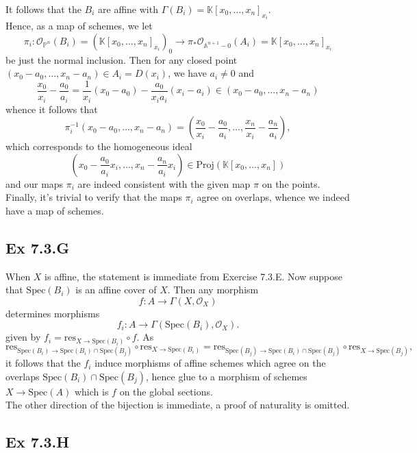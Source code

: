 \documentclass{article}
\theoremstyle{definition}
\newcommand{\K}{\mathbb{K}}
\renewcommand{\P}{\mathbb{P}}
\newcommand{\A}{\mathbb{A}}
\newcommand{\Pn}{\P^n}
\newcommand{\Spec}{\text{Spec}}
\begin{document}
It follows that the $B_i$ are affine with $\Gamma(B_i) = \K[x_{0}, \ldots,
		x_n]_{x_i}$. \\

Hence, as a map of schemes, we let
\[
	\pi_i
	:
	\mathcal{O}_{\Pn}(B_i)
	=
	(\K[x_{0}, \ldots, x_n]_{x_i})_0
	\to
	\pi_{*} \mathcal{O}_{\A^{n + 1} - 0}(A_i)
	=
	\K[x_{0}, \ldots, x_n]_{x_i}
\]
be just the normal inclusion. Then for any closed point $(x_{0} - a_0, \ldots,
	x_n - a_n) \in A_i = D(x_i)$, we have $a_i \not = 0$ and
\[
	\frac{x_{0}}{x_i} - \frac{a_{0}}{a_i}
	=
	\frac{1}{x_{i}}(x_{0} - a_{0})
	-
	\frac{a_{0}}{x_i a_i} (x_i - a_i)
	\in
	(x_{0} - a_0, \ldots, x_n - a_n)
\]
whence it follows that
\[
	\pi_i^{-1}(x_{0} - a_0, \ldots, x_n - a_n)
	=
	\left(\frac{x_{0}}{x_{i}} - \frac{a_{0}}{a_i}, \ldots, \frac{x_n}{x_i} - \frac{a_n}{a_i}\right),
\]
which corresponds to the homogeneous ideal
\[
	\left(x_{0} - \frac{a_{0}}{a_i} x_i, \ldots, x_n - \frac{a_n}{a_i}
	x_i\right) \in \text{Proj}(\K[x_{0}, \ldots, x_n])
\]
and our maps $\pi_i$ are indeed consistent with the given map $\pi$ on the points. \\

Finally, it's trivial to verify that the maps $\pi_i$ agree on overlaps, whence
we indeed have a map of schemes.

\subsection*{Ex 7.3.G}

When $X$ is affine, the statement is immediate from Exercise 7.3.E. Now suppose
that $\Spec(B_i)$ is an affine cover of $X$. Then any morphism
\[
	f : A \to \Gamma(X, \mathcal{O}_X)
\]
determines morphisms
\[
	f_i : A \to \Gamma(\Spec(B_i), \mathcal{O}_X).
\]
given by $f_i = \text{res}_{X \to \Spec(B_i)} \circ f$. As
\[
	\text{res}_{\Spec(B_i) \to \Spec(B_i) \cap \Spec(B_j)}
	\circ
	\text{res}_{X \to \Spec(B_i)}
	=
	\text{res}_{\Spec(B_j) \to \Spec(B_i) \cap \Spec(B_j)}
	\circ
	\text{res}_{X \to \Spec(B_j)},
\]
it follows that the $f_i$ induce morphisms of affine schemes which agree on the
overlaps $\Spec(B_i) \cap \Spec(B_j)$, hence glue to a morphism of schemes $X
	\to \Spec(A)$ which is $f$ on the global sections. \\

The other direction of the bijection is immediate, a proof of naturality is
omitted.

\subsection*{Ex 7.3.H}
\end{document}
